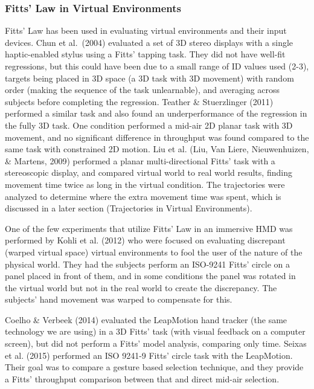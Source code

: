 \subsubsection{Fitts' Law in Virtual Environments}\label{applying-fitts-to-virtual-environment}

Fitts' Law has been used in evaluating virtual environments and their input devices.
Chun et al.\ (2004) evaluated a set of 3D stereo displays with a single haptic-enabled stylus using a Fitts' tapping task.
They did not have well-fit regressions, but this could have been due to a small range of ID values used (2-3), targets being placed in 3D space (a 3D task with 3D movement) with random order (making the sequence of the task unlearnable), and averaging across subjects before completing the regression.
Teather \& Stuerzlinger (2011) performed a similar task and also found an underperformance of the regression in the fully 3D task.
One condition performed a mid-air 2D planar task with 3D movement, and no significant difference in throughput was found compared to the same task with constrained 2D motion.
Liu et al.
(Liu, Van Liere, Nieuwenhuizen, \& Martens, 2009) performed a planar multi-directional Fitts' task with a stereoscopic display, and compared virtual world to real world results, finding movement time twice as long in the virtual condition.
The trajectories were analyzed to determine where the extra movement time was spent, which is discussed in a later section (Trajectories in Virtual Environments).

One of the few experiments that utilize Fitts' Law in an immersive HMD was performed by Kohli et al.
(2012) who were focused on evaluating discrepant (warped virtual space) virtual environments to fool the user of the nature of the physical world.
They had the subjects perform an ISO-9241 Fitts' circle on a panel placed in front of them, and in some conditions the panel was rotated in the virtual world but not in the real world to create the discrepancy.
The subjects' hand movement was warped to compensate for this.

Coelho \& Verbeek (2014) evaluated the LeapMotion hand tracker (the same technology we are using) in a 3D Fitts' task (with visual feedback on a computer screen), but did not perform a Fitts' model analysis, comparing only time.
Seixas et al.
(2015) performed an ISO 9241-9 Fitts' circle task with the LeapMotion.
Their goal was to compare a gesture based selection technique, and they provide a Fitts' throughput comparison between that and direct mid-air selection.

